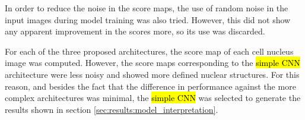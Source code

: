 In order to reduce the noise in the score maps, the use of random noise in the input images during model training was also tried. However, this did not show any apparent improvement in the scores more, so its use was discarded.

For each of the three proposed architectures, the score map of each cell nucleus image was computed. However, the score maps corresponding to the \hl{simple CNN} architecture were less noisy and showed more defined nuclear structures. For this reason, and besides the fact that the difference in performance against the more complex architectures was minimal, the \hl{simple CNN} was selected to generate the results shown in section \ref{sec:results:model_interpretation}.
